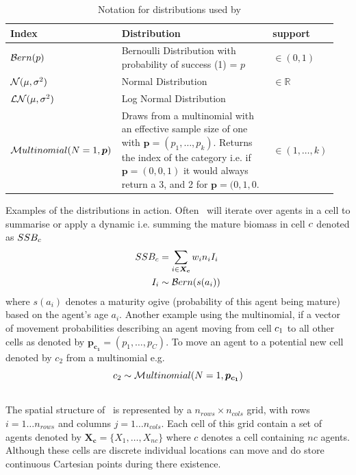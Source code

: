\begin{table}[H]
	\centering
	\begin{tabular}{p{0.25\linewidth} | p{0.5\linewidth} | p{0.2\linewidth}}
		Index  & Distribution & support \\ 
		\hline
		\(\mathcal{B}ern(p)\) & Bernoulli Distribution with probability of success (1) = \(p\)& \(\in (0,1)\)\\
		\(\mathcal{N}(\mu, \sigma^2)\) & Normal Distribution & \(\in \mathbb{R}\)\\	
		\(\mathcal{LN}(\mu, \sigma^2)\) & Log Normal Distribution & \\
		\(\mathcal{M}ultinomial(N = 1, \bm{p})\) & Draws from a multinomial with an effective sample size of one with \(\bm{p} = (p_1, \dots, p_k)\). Returns the index of the category i.e. if \(\bm{p} = (0,0,1)\) it would always return a 3, and 2 for \(\bm{p} = (0,1,0\).& \(\in (1,\dots, k)\)
		
	\end{tabular}
	\caption{Notation for distributions used by \IBM}
		\label{tab:distributions}
	\end{table}
%
Examples of the distributions in action. Often \IBM\ will iterate over agents in a cell to summarise or apply a dynamic i.e. summing the mature biomass in cell \(c\) denoted as \(SSB_c\)
\begin{align*}
    	SSB_c & = \sum\limits_{i \in \bm{X_c}} w_i n_i I_i\\
    	I_i & \sim \mathcal{B}ern(s(a_i))
\end{align*}
where \(s(a_i)\) denotes a maturity ogive (probability of this agent being mature) based on the agent's age \(a_i\). Another example using the multinomial, if a vector of movement probabilities describing an agent moving from cell \(c_1\) to all other cells as denoted by \(\bm{p_{c_1}} = (p_1, \dots, p_C)\). To move an agent to a potential new cell denoted by \(c_2\) from a multinomial e.g.
\begin{equation}
	c_2 \sim \mathcal{M}ultinomial(N = 1, \bm{p_{c_1}})
\end{equation}
%

\subsection{\label{sec:spatial-structure}}
The spatial structure of \IBM\ is represented by a $n_{rows} \times n_{cols}$ grid, with rows $i=1 \dots n_{rows}$ and columns $j=1 \ldots n_{cols}$. Each cell of this grid contain a set of agents denoted by \(\bm{X_c} = \{X_1, \dots, X_{nc}\}\) where \(c\) denotes a cell containing \(nc\) agents. Although these cells are discrete individual locations can move and do store continuous Cartesian points during there existence. 

